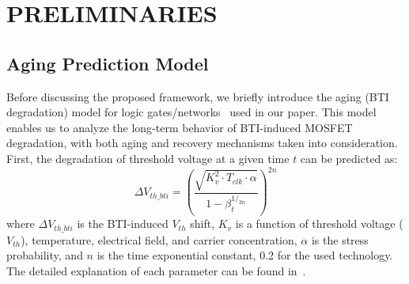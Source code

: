 \section{PRELIMINARIES}
\label{sec:preliminary}

\subsection{Aging Prediction Model}
\label{subsec:apm}
Before discussing the proposed framework, we briefly introduce the aging (BTI degradation) model for logic gates/networks~\cite{wang2010impact, wang2007efficient, gomez2016early, amrouch2016reliability} used in our paper. This model enables us to analyze the long-term behavior of BTI-induced MOSFET degradation, with both aging and recovery mechanisms taken into consideration. First, the degradation of threshold voltage at a given time $t$ can be predicted as:
\begin{equation}
\label{eq:dtv}
\Delta V_{th\_bti}=\left(\frac{\sqrt{K_v^2 \cdot T_{clk} \cdot \alpha}}{1-\beta_t^{1/_{2n}}}\right)^{2n}
\end{equation}
where $\Delta V_{th\_bti}$ is the BTI-induced $V_{th}$ shift, $K_v$ is a function of threshold voltage ($V_{th}$), temperature, electrical field, and carrier concentration, $\alpha$ is the stress probability, and $n$ is the time exponential constant, 0.2 for the used technology. The detailed explanation of each parameter can be found in~\cite{wang2010impact}. 

